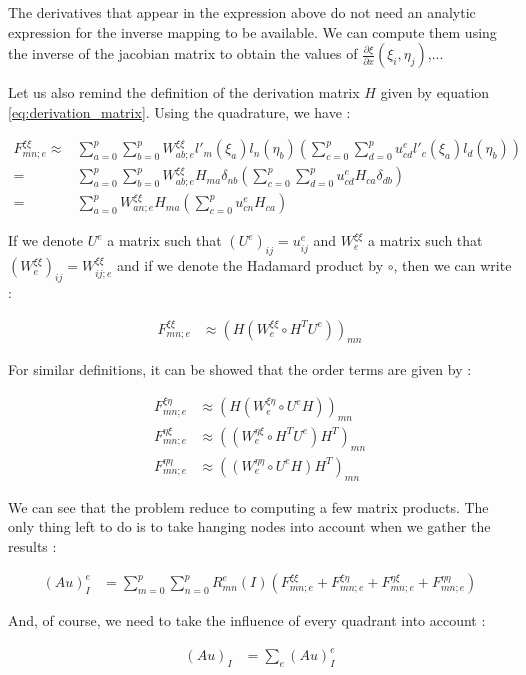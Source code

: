 The derivatives that appear in the expression above do not need an analytic expression for the inverse mapping to be available. We can compute them using the inverse of the jacobian matrix to obtain the values of $\frac{\partial \xi}{\partial x}(\xi_i,\eta_j)$,...

Let us also remind the definition of the derivation matrix $H$ given by equation \ref{eq:derivation_matrix}. Using the quadrature, we have : 

\begin{align*}
F^{\xi\xi}_{mn;e} \approx& \sum_{a=0}^p\sum_{b=0}^p W^{\xi\xi}_{ab;e} l'_m(\xi_a)l_n(\eta_b)\left( \sum_{c=0}^p\sum_{d=0}^p u^e_{cd}l'_c(\xi_a)l_d(\eta_b)\right) \\
=& \sum_{a=0}^p\sum_{b=0}^p W^{\xi\xi}_{ab;e} H_{ma} \delta_{nb} \left( \sum_{c=0}^p\sum_{d=0}^p u^e_{cd}H_{ca}\delta_{db}\right) \\
=& \sum_{a=0}^p W_{an;e}^{\xi\xi}H_{ma}\left(\sum_{c=0}^p u^e_{cn}H_{ca}\right)
\end{align*}

If we denote $U^e$ a matrix such that $(U^e)_{ij} = u^e_{ij}$ and $W^{\xi\xi}_e$ a matrix such that $(W^{\xi\xi}_e)_{ij} = W^{\xi\xi}_{ij;e}$ and if we denote the Hadamard product by $\circ$,  then we can write : 

\begin{align*}
F^{\xi\xi}_{mn;e} &\approx \left( H(W_e^{\xi\xi} \circ H^TU^e)\right)_{mn}
\end{align*}

For similar definitions, it can be showed that the order terms are given by :  

\begin{align*}
F^{\xi\eta}_{mn;e} &\approx \left( H(W_e^{\xi\eta} \circ U^eH)\right)_{mn}\\
F^{\eta\xi}_{mn;e} &\approx \left( (W_e^{\eta\xi} \circ H^TU^e)H^T\right)_{mn}\\
F^{\eta\eta}_{mn;e} &\approx \left( (W_e^{\eta\eta} \circ U^eH)H^T\right)_{mn}
\end{align*}

We can see that the problem reduce to computing a few matrix products. The only thing left to do is to take hanging nodes into account when we gather the results : 

\begin{align*}
(Au)^e_I &= \sum_{m=0}^p\sum_{n=0}^p R^e_{mn}(I) \left(F_{mn;e}^{\xi\xi}+F_{mn;e}^{\xi\eta}+F_{mn;e}^{\eta\xi}+F_{mn;e}^{\eta\eta} \right)
\end{align*}

And, of course, we need to take the influence of every quadrant into account : 

\begin{align*}
(Au)_I &= \sum_e (Au)_I^e
\end{align*}



